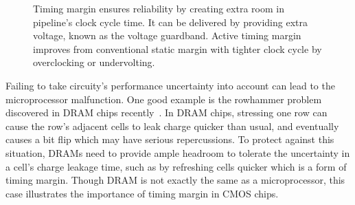 \begin{figure}[t]
\centering
{}
\hfill
{}
\hfill
{}
\caption{Timing margin ensures reliability by creating extra room in pipeline's clock cycle time. It can be delivered by providing extra voltage, known as the voltage guardband. Active timing margin improves from conventional static margin with tighter clock cycle by overclocking or undervolting.}
\end{figure}

Failing to take circuity's performance uncertainty into account can lead to the microprocessor malfunction. One good example is the rowhammer problem discovered in DRAM chips recently~\cite{kim2014flipping}. In DRAM chips, stressing one row can cause the row's adjacent cells to leak charge quicker than usual, and eventually causes a bit flip which may have serious repercussions. To protect against this situation, DRAMs need to provide ample headroom to tolerate the uncertainty in a cell's charge leakage time, such as by refreshing cells quicker which is a form of timing margin. Though DRAM is not exactly the same as a microprocessor, this case illustrates the importance of timing margin in CMOS chips.

